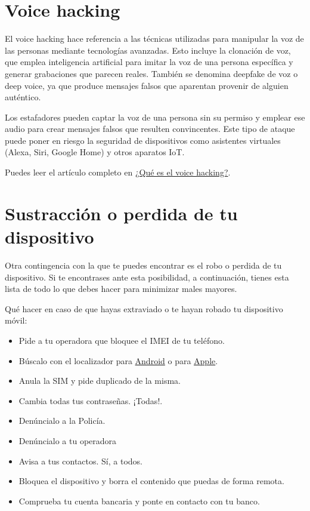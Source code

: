 \documentclass[
  a4paper,
  openany]{book}
\begin{document}
\hypertarget{voice-hacking}{%
\section{Voice hacking}\label{voice-hacking}}

El voice hacking hace referencia a las técnicas utilizadas para manipular la voz de las personas mediante tecnologías avanzadas. Esto incluye la clonación de voz, que emplea inteligencia artificial para imitar la voz de una persona específica y generar grabaciones que parecen reales. También se denomina deepfake de voz o deep voice, ya que produce mensajes falsos que aparentan provenir de alguien auténtico.

Los estafadores pueden captar la voz de una persona sin su permiso y emplear ese audio para crear mensajes falsos que resulten convincentes. Este tipo de ataque puede poner en riesgo la seguridad de dispositivos como asistentes virtuales (Alexa, Siri, Google Home) y otros aparatos IoT.

Puedes leer el artículo completo en \href{https://www.incibe.es/ciudadania/blog/que-es-el-voice-hacking}{¿Qué es el voice hacking?}.

\hypertarget{sustracciuxf3n-o-perdida-de-tu-dispositivo}{%
\section{Sustracción o perdida de tu dispositivo}\label{sustracciuxf3n-o-perdida-de-tu-dispositivo}}

Otra contingencia con la que te puedes encontrar es el robo o perdida de tu dispositivo. Si te encontrases ante esta posibilidad, a continuación, tienes esta lista de todo lo que debes hacer para minimizar males mayores.

Qué hacer en caso de que hayas extraviado o te hayan robado tu dispositivo móvil:

\begin{itemize}
\item
  Pide a tu operadora que bloquee el IMEI de tu teléfono.
\item
  Búscalo con el localizador para \href{https://myaccount.google.com/intro/find-your-phone?hl=es-ES}{Android} o para \href{https://www.apple.com/es/icloud/find-my/}{Apple}.
\item
  Anula la SIM y pide duplicado de la misma.
\item
  Cambia todas tus contraseñas. ¡Todas!.
\item
  Denúncialo a la Policía.
\item
  Denúncialo a tu operadora
\item
  Avisa a tus contactos. Sí, a todos.
\item
  Bloquea el dispositivo y borra el contenido que puedas de forma remota.
\item
  Comprueba tu cuenta bancaria y ponte en contacto con tu banco.
\end{itemize}
\end{document}

